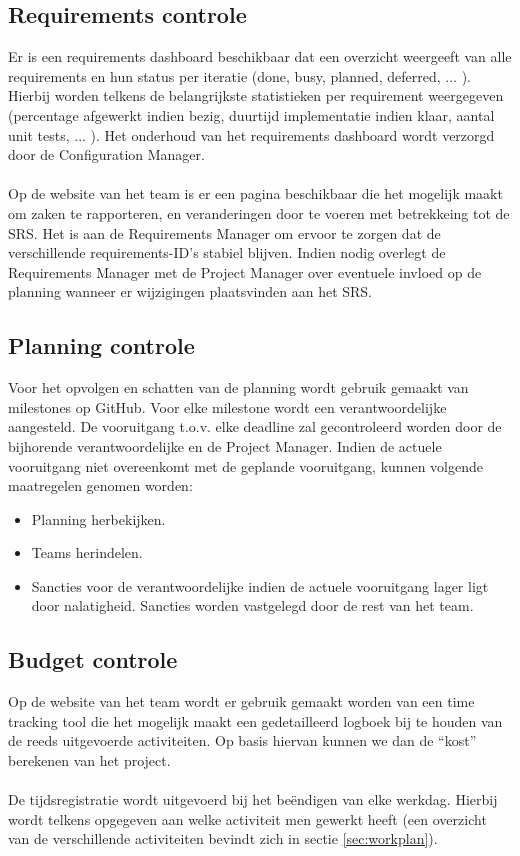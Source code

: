 \subsection{Requirements controle} \label{RequirementsControlPlan}
Er is een requirements dashboard beschikbaar dat een overzicht weergeeft van alle requirements en hun status per iteratie (done, busy, planned, deferred, ... ). Hierbij worden telkens de belangrijkste statistieken per requirement weergegeven (percentage afgewerkt indien bezig, duurtijd implementatie indien klaar, aantal unit tests, ... ). Het onderhoud van het requirements dashboard wordt verzorgd door de Configuration Manager.
\\
\\
Op de website van het team \cite{portalWebsite} is er een pagina beschikbaar die het mogelijk maakt om zaken te rapporteren, en veranderingen door te voeren met betrekkeing tot de SRS. Het is aan de Requirements Manager om ervoor te zorgen dat de verschillende requirements-ID's stabiel blijven. Indien nodig overlegt de Requirements Manager met de Project Manager over eventuele invloed op de planning wanneer er wijzigingen plaatsvinden aan het SRS.

\subsection{Planning controle}
Voor het opvolgen en schatten van de planning wordt gebruik gemaakt van milestones op GitHub.  Voor elke milestone wordt een verantwoordelijke aangesteld. De vooruitgang t.o.v. elke deadline zal gecontroleerd worden door de bijhorende verantwoordelijke en de Project Manager. Indien de actuele vooruitgang niet overeenkomt met de geplande vooruitgang, kunnen volgende maatregelen genomen worden:
\begin{itemize}
	\item Planning herbekijken.
	\item Teams herindelen.
	\item Sancties voor de verantwoordelijke indien de actuele vooruitgang lager ligt door nalatigheid. Sancties worden vastgelegd door de rest van het team.
\end{itemize} 

\subsection{Budget controle}
Op de website van het team \cite{portalWebsite} wordt er gebruik gemaakt worden van een time tracking tool die het mogelijk maakt een gedetailleerd logboek bij te houden van de reeds uitgevoerde activiteiten. Op basis hiervan kunnen we dan de ``kost'' berekenen van het project. 
\\
\\
De tijdsregistratie wordt uitgevoerd bij het be\"{e}ndigen van elke werkdag. Hierbij wordt telkens opgegeven aan welke activiteit men gewerkt heeft (een overzicht van de verschillende activiteiten bevindt zich in sectie \ref{sec:workplan}).

